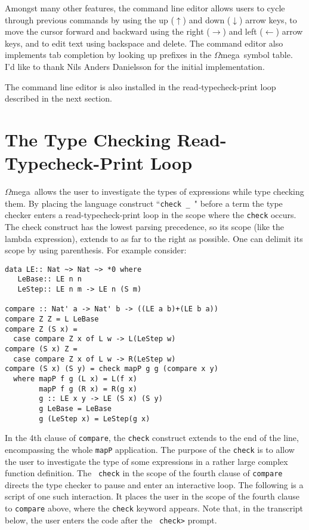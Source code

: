 \documentclass[11pt,twoside]{article}
\newcommand{\om}{$\Omega$mega}
\begin{document}
Amongst many other features, the command line editor allows users
to cycle through previous commands by using the up ($\uparrow$)
and down ($\downarrow$) arrow keys, to move the cursor forward and
backward using the right ($\rightarrow$) and left ($\leftarrow$)
arrow keys, and to edit text using backspace and delete. The
command editor also implements tab completion by looking up
prefixes in the \om\ symbol table. I'd like to thank 
Nils Anders Danielsson for the initial implementation.

The command line editor is also installed in the read-typecheck-print
loop described in the next section.


\vspace*{.2in}

\section{The Type Checking Read-Typecheck-Print Loop} \label{typechecker}
\om\ allows the user to investigate the types of expressions while type
checking them. By placing the language construct ``{\tt check \_ }" before a
term the type checker enters a read-typecheck-print loop in the scope where
the {\tt check} occurs. The check construct has the lowest parsing
precedence, so its scope (like the lambda expression), extends to as far to
the right as possible. One can delimit its scope by using parenthesis.
For example consider:

\begin{verbatim}
data LE:: Nat ~> Nat ~> *0 where
   LeBase:: LE n n
   LeStep:: LE n m -> LE n (S m)

compare :: Nat' a -> Nat' b -> ((LE a b)+(LE b a))
compare Z Z = L LeBase
compare Z (S x) = 
  case compare Z x of L w -> L(LeStep w)
compare (S x) Z =
  case compare Z x of L w -> R(LeStep w)
compare (S x) (S y) = check mapP g g (compare x y)
  where mapP f g (L x) = L(f x)
        mapP f g (R x) = R(g x)
        g :: LE x y -> LE (S x) (S y)
        g LeBase = LeBase
        g (LeStep x) = LeStep(g x)
\end{verbatim}
In the 4th clause of {\tt compare}, the {\tt check} construct
extends to the end of the line, encompassing the whole {\tt mapP}
application. The purpose of the {\tt check} is to allow the user to investigate the type
of some expressions in a rather large complex function definition. The {\tt
check} in the scope of the fourth clause of {\tt compare} directs the type
checker to pause and enter an interactive loop. The following is a script
of one such interaction. It places the user in the scope of the fourth
clause to {\tt compare} above, where the {\tt check} keyword appears. Note
that, in the transcript below, the user enters the code after the {\tt
check>} prompt.
\end{document}
